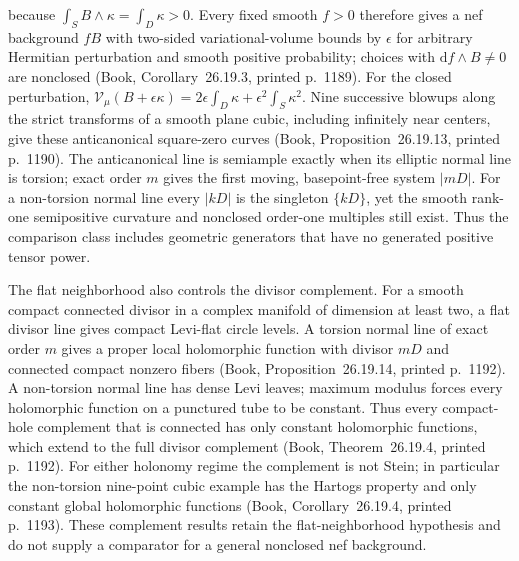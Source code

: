 \documentclass[11pt]{article}
\begin{document}
because $\int_SB\wedge\kappa=\int_D\kappa>0$. Every fixed smooth $f>0$ therefore gives a nef background $fB$ with two-sided variational-volume bounds by $\epsilon$ for arbitrary Hermitian perturbation and smooth positive probability; choices with $\mathrm df\wedge B\ne0$ are nonclosed (Book, Corollary~26.19.3, printed p.~1189). For the closed perturbation, $\mathcal V_\mu(B+\epsilon\kappa)=2\epsilon\int_D\kappa+\epsilon^2\int_S\kappa^2$. Nine successive blowups along the strict transforms of a smooth plane cubic, including infinitely near centers, give these anticanonical square-zero curves (Book, Proposition~26.19.13, printed p.~1190). The anticanonical line is semiample exactly when its elliptic normal line is torsion; exact order $m$ gives the first moving, basepoint-free system $|mD|$. For a non-torsion normal line every $|kD|$ is the singleton $\{kD\}$, yet the smooth rank-one semipositive curvature and nonclosed order-one multiples still exist. Thus the comparison class includes geometric generators that have no generated positive tensor power.\par The flat neighborhood also controls the divisor complement. For a smooth compact connected divisor in a complex manifold of dimension at least two, a flat divisor line gives compact Levi-flat circle levels. A torsion normal line of exact order $m$ gives a proper local holomorphic function with divisor $mD$ and connected compact nonzero fibers (Book, Proposition~26.19.14, printed p.~1192). A non-torsion normal line has dense Levi leaves; maximum modulus forces every holomorphic function on a punctured tube to be constant. Thus every compact-hole complement that is connected has only constant holomorphic functions, which extend to the full divisor complement (Book, Theorem~26.19.4, printed p.~1192). For either holonomy regime the complement is not Stein; in particular the non-torsion nine-point cubic example has the Hartogs property and only constant global holomorphic functions (Book, Corollary~26.19.4, printed p.~1193). These complement results retain the flat-neighborhood hypothesis and do not supply a comparator for a general nonclosed nef background.
\end{document}
